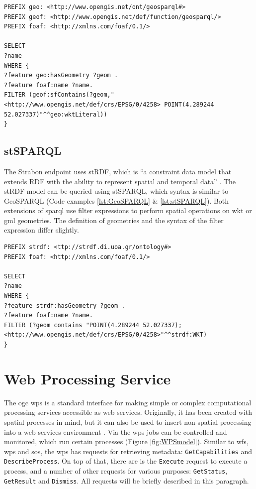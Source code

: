 \begin{lstlisting}[float,caption={A GeoSPARQL query to find the names of features that contain a point geometry}, label={lst:GeoSPARQL}]
PREFIX geo: <http://www.opengis.net/ont/geosparql#>
PREFIX geof: <http://www.opengis.net/def/function/geosparql/>
PREFIX foaf: <http://xmlns.com/foaf/0.1/> 

SELECT 
?name
WHERE {
?feature geo:hasGeometry ?geom .
?feature foaf:name ?name.
FILTER (geof:sfContains(?geom,"<http://www.opengis.net/def/crs/EPSG/0/4258> POINT(4.289244 52.027337)"^^geo:wktLiteral))
}
\end{lstlisting}

\subsection{stSPARQL}
\label{par:stSPARQL}
The Strabon endpoint uses stRDF, which is \enquote{a constraint data model that extends RDF with the ability to represent spatial and temporal data} \cite[p. 425]{SSW:Koubarakis}. The stRDF model can be queried using stSPARQL, which syntax is similar to GeoSPARQL (Code examples \ref{lst:GeoSPARQL} \& \ref{lst:stSPARQL}). Both extensions of \ac{sparql} use filter expressions to perform spatial operations on \ac{wkt} or \ac{gml} geometries. The definition of geometries and the syntax of the filter expression differ slightly.

\begin{lstlisting}[float,caption={A stSPARQL query to find the names of features that contain a point geometry}, label={lst:stSPARQL}]
PREFIX strdf: <ttp://strdf.di.uoa.gr/ontology#>
PREFIX foaf: <http://xmlns.com/foaf/0.1/> 

SELECT 
?name
WHERE {
?feature strdf:hasGeometry ?geom .
?feature foaf:name ?name.
FILTER (?geom contains "POINT(4.289244 52.027337);<http://www.opengis.net/def/crs/EPSG/0/4258>"^^strdf:WKT)
}
\end{lstlisting}

\section{Web Processing Service}
\label{par:wps}
The \ac{ogc} \acl{wps} is a standard interface for making simple or complex computational processing services accessible as web services. Originally, it has been created with spatial processes in mind, but it can also be used to insert non-spatial processing into a web services environment \citep[p. 8]{GEO:OGC}. Via the \ac{wps} jobs can be controlled and monitored, which run certain processes (Figure \ref{fig:WPSmodel}). Similar to \ac{wfs}, \ac{wps} and \ac{sos}, the \ac{wps} has requests for retrieving metadata: \texttt{GetCapabilities} and \texttt{DescribeProcess}. On top of that, there are is the \texttt{Execute} request to execute a process, and a number of other requests for various purposes: \texttt{GetStatus}, \texttt{GetResult} and \texttt{Dismiss}. All requests will be briefly described in this paragraph.  

